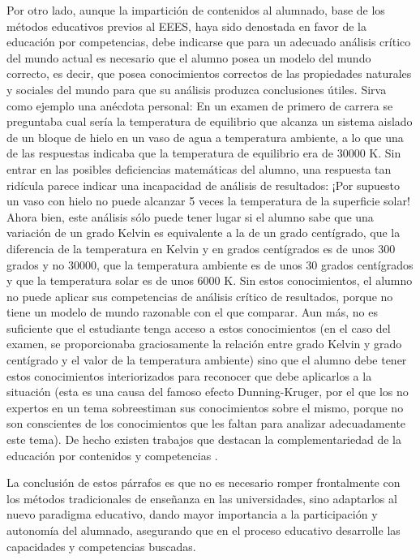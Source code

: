 \documentclass[a4paper,12pt,twoside]{article}
\begin{document}
Por otro lado, aunque la impartición de contenidos al alumnado, base de los métodos educativos previos al EEES, haya sido denostada en favor de la educación por competencias, debe indicarse que para un adecuado análisis crítico del mundo actual es necesario que el alumno posea un modelo del mundo correcto, es decir, que posea conocimientos correctos de las propiedades naturales y sociales del mundo para que su análisis produzca conclusiones útiles. Sirva como ejemplo una anécdota personal: En un examen de primero de carrera se preguntaba cual sería la temperatura de equilibrio que alcanza un sistema aislado de un bloque de hielo en un vaso de agua a temperatura ambiente, a lo que una de las respuestas indicaba que la temperatura de equilibrio era de 30000 K. Sin entrar en las posibles deficiencias matemáticas del alumno, una respuesta tan ridícula parece indicar una incapacidad de análisis de resultados: ¡Por supuesto un vaso con hielo no puede alcanzar 5 veces la temperatura de la superficie solar! Ahora bien, este análisis sólo puede tener lugar si el alumno sabe que una variación de un grado Kelvin es equivalente a la de un grado centígrado, que la diferencia de la temperatura en Kelvin y en grados centígrados es de unos 300 grados y no 30000, que la temperatura ambiente es de unos 30 grados centígrados y que la temperatura solar es de unos 6000 K. Sin estos conocimientos, el alumno no puede aplicar sus competencias de análisis crítico de resultados, porque no tiene un modelo de mundo razonable con el que comparar. Aun más, no es suficiente que el estudiante tenga acceso a estos conocimientos (en el caso del examen, se proporcionaba graciosamente la relación entre grado Kelvin y grado centígrado y el valor de la temperatura ambiente) sino que el alumno debe tener estos conocimientos interiorizados para reconocer que debe aplicarlos a la situación (esta es una causa del famoso efecto Dunning-Kruger, por el que los no expertos en un tema sobreestiman sus conocimientos sobre el mismo, porque no son conscientes de los conocimientos que les faltan para analizar adecuadamente este tema). De hecho existen trabajos que destacan la complementariedad de la educación por contenidos y competencias \cite{Angulo11}.

La conclusión de estos párrafos es que no es necesario romper frontalmente con los métodos tradicionales de enseñanza en las universidades, sino adaptarlos al nuevo paradigma educativo, dando mayor importancia a la participación y autonomía del alumnado, asegurando que en el proceso educativo desarrolle las capacidades y competencias buscadas.
\end{document}
